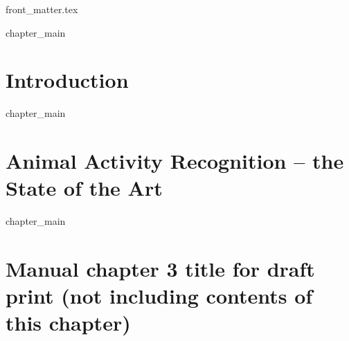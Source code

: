 \documentclass[cover]{dissertation}
\begin{document}
\sloppy
\def \myAuthorName{John Doe}
\def \myTitle{Your Title}
\def \mySubTitle{Optional subtitle}





\newcommand{\mainrq}{
\medskip
\textit{
How do you define a good research question? 
}
\medskip
}

\ifdraft
\else
    {front_matter.tex}
\fi

\tableofcontents
\ifdraft
\fi

\mainmatter
\thumbtrue

\chaponetrue
\chaptwotrue
\chapeighttrue


\ifchapone
    {chapter_main}
\else
    \chapter{Introduction} %
    \label{chapter:introduction}
\fi

\ifchaptwo
    {chapter_main}
\else
    \chapter{Animal Activity Recognition -- the State of the Art} %
    \label{chapter:state_of_the_art}
\fi

\ifchapthree
    {chapter_main}
\else
    \chapter{Manual chapter 3 title for draft print (not including contents of this chapter)}
    \label{chapter:your_chapter_title_when_not_included}
\fi

\end{document}

